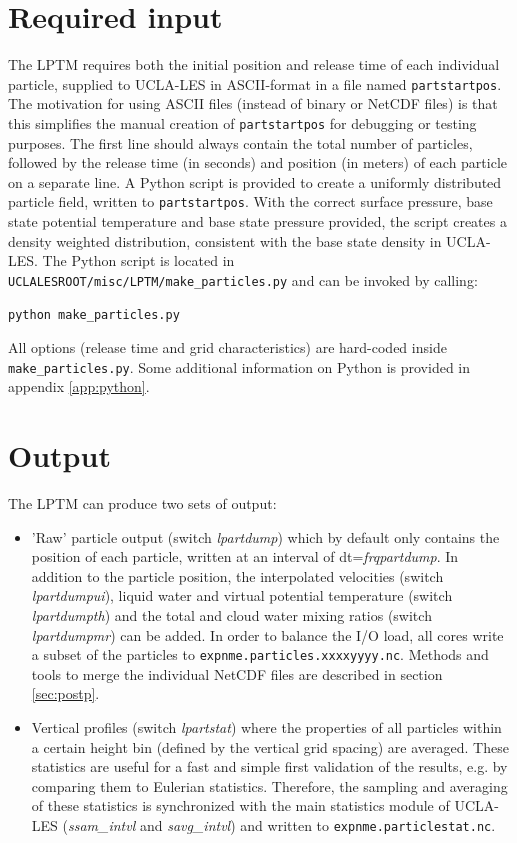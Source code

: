\documentclass[twoside,a4paper]{report}
\begin{document}
\section{Required input}
\label{sec:req_input}

The LPTM requires both the initial position and release time of each individual particle, supplied to UCLA-LES in ASCII-format in a file named \texttt{partstartpos}. The motivation for using ASCII files (instead of binary or NetCDF files) is that this simplifies the manual creation of \texttt{partstartpos} for debugging or testing purposes. The first line should always contain the total number of particles, followed by the release time (in seconds) and position (in meters) of each particle on a separate line. A Python script is provided to create a uniformly distributed particle field, written to \texttt{partstartpos}. With the correct surface pressure, base state potential temperature and base state pressure provided, the script creates a density weighted distribution, consistent with the base state density in UCLA-LES. The Python script is located in \texttt{UCLALESROOT/misc/LPTM/make\_particles.py} and can be invoked by calling:

\begin{verbatim}
python make_particles.py
\end{verbatim}

All options (release time and grid characteristics) are hard-coded inside \texttt{make\_particles.py}. Some additional information on Python is provided in appendix \ref{app:python}.

\section{Output}
\label{sec:output}

The LPTM can produce two sets of output:
\begin{itemize}
 \item 'Raw' particle output (switch \textit{lpartdump}) which by default only contains the position of each particle, written at an interval of dt=\textit{frqpartdump}. In addition to the particle position, the interpolated velocities (switch \textit{lpartdumpui}), liquid water and virtual potential temperature (switch \textit{lpartdumpth}) and the total and cloud water mixing ratios (switch \textit{lpartdumpmr}) can be added. In order to balance the I/O load, all cores write a subset of the particles to \texttt{expnme.particles.xxxxyyyy.nc}. Methods and tools to merge the individual NetCDF files are described in section \ref{sec:postp}.
 \item Vertical profiles (switch \textit{lpartstat}) where the properties of all particles within a certain height bin (defined by the vertical grid spacing) are averaged. These statistics are useful for a fast and simple first validation of the results, e.g. by comparing them to Eulerian statistics. Therefore, the sampling and averaging of these statistics is synchronized with the main statistics module of UCLA-LES (\textit{ssam\_intvl} and \textit{savg\_intvl}) and written to \texttt{expnme.particlestat.nc}.
\end{itemize}
\end{document}
